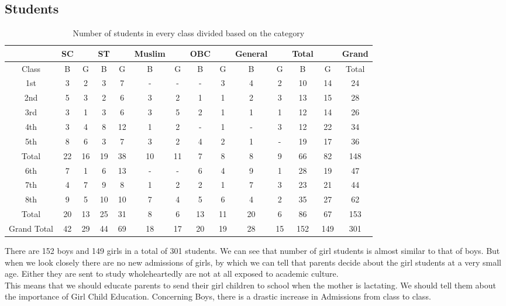 \subsection{Students}
\begin{table}[H]
    \centering
    \begin{tabular}{c|c|c|c|c|c|c|c|c|c|c|c|c|c} \bottomrule \toprule 
          & \multicolumn{1}{c}{SC} & &  \multicolumn{1}{c}{ST} & & \multicolumn{1}{c}{Muslim} & &  \multicolumn{1}{c}{OBC} & & \multicolumn{1}{c}{General} & & \multicolumn{1}{c}{Total} & & Grand  \\ \bottomrule \toprule
         Class & B & G & B & G & B & G & B & G & B & G & B & G & Total \\ \bottomrule \toprule 
         1st & 3 & 2 & 3 & 7 & - & - & - & 3 & 4 & 2 & 10 & 14 & 24  \\ \hline 
         2nd & 5 & 3 & 2 & 6 & 3 & 2 & 1 & 1 & 2 & 3 & 13 & 15 & 28 \\ \hline 
         3rd & 3 & 1 & 3 & 6 & 3 & 5 & 2 & 1 & 1 & 1 & 12 & 14 & 26 \\ \hline
         4th & 3 & 4 & 8 & 12 & 1 & 2 & - & 1 & - & 3 & 12 & 22 & 34 \\ \hline
         5th & 8 & 6 & 3 & 7 & 3 & 2 & 4 & 2 & 1 & - & 19 & 17 & 36 \\  \hline 
         Total & 22 & 16 & 19 & 38 & 10 & 11 & 7 & 8 & 8 & 9 & 66 & 82 & 148 \\ \bottomrule \toprule 
         6th & 7 & 1 & 6 & 13 & - & - & 6 & 4 & 9 & 1 & 28 & 19 & 47 \\ \hline
         7th & 4 & 7 & 9 & 8 & 1 & 2 & 2 & 1 & 7 & 3 & 23 & 21 & 44 \\ \hline
         8th & 9 & 5 & 10 & 10 & 7 & 4 & 5 & 6 & 4 & 2 & 35 & 27 & 62 \\ \hline 
         Total & 20 & 13 & 25 & 31 & 8 & 6 & 13 & 11 & 20 & 6 & 86 & 67 & 153 \\ \hline 
         Grand Total & 42 & 29 & 44 & 69 & 18 & 17 & 20 & 19 & 28 & 15 & 152 & 149 & 301 \\ \bottomrule \toprule 
    \end{tabular}
    \caption{Number of students in every class divided based on the category}
\end{table}

There are 152 boys and 149 girls in a total of 301 students. We can see that number of girl students is almost similar to that of boys. But when we look closely there are no new admissions of girls, by which we can tell that parents decide about the girl students at a very small age. Either they are sent to study wholeheartedly are not at all exposed to academic culture.\\ [1\baselineskip]
This means that we should educate parents to send their girl children to school when the mother is lactating. We should tell them about the importance of Girl Child Education. Concerning Boys, there is a drastic increase in Admissions from class to class. 

